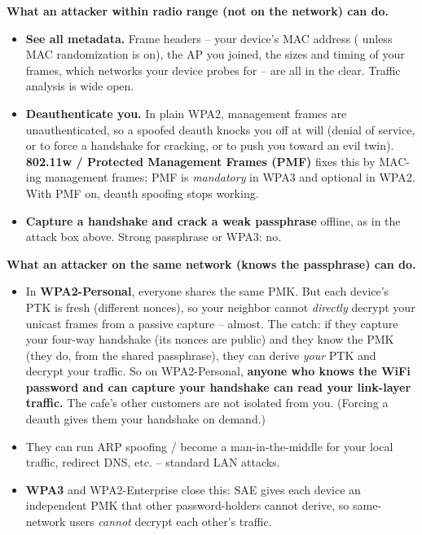 \begin{focusbox}
\textbf{What an attacker within radio range (not on the network) can do.}
\begin{itemize}
  \item \textbf{See all metadata.} Frame headers -- your device's MAC address (
        unless MAC randomization is on), the AP you joined, the sizes and timing
        of your frames, which networks your device probes for -- are all in the
        clear. Traffic analysis is wide open.
  \item \textbf{Deauthenticate you.} In plain WPA2, management frames are
        unauthenticated, so a spoofed deauth knocks you off at will (denial of
        service, or to force a handshake for cracking, or to push you toward an
        evil twin). \textbf{802.11w / Protected Management Frames (PMF)} fixes
        this by MAC-ing management frames; PMF is \emph{mandatory} in WPA3 and
        optional in WPA2. With PMF on, deauth spoofing stops working.
  \item \textbf{Capture a handshake and crack a weak passphrase} offline, as in
        the attack box above. Strong passphrase or WPA3: no.
\end{itemize}

\textbf{What an attacker on the same network (knows the passphrase) can do.}
\begin{itemize}
  \item In \textbf{WPA2-Personal}, everyone shares the same PMK. But each device's
        PTK is fresh (different nonces), so your neighbor cannot \emph{directly}
        decrypt your unicast frames from a passive capture -- almost. The catch:
        if they capture your four-way handshake (its nonces are public) and they
        know the PMK (they do, from the shared passphrase), they can derive \emph{your}
        PTK and decrypt your traffic. So on WPA2-Personal, \textbf{anyone who knows
        the WiFi password and can capture your handshake can read your link-layer
        traffic.} The cafe's other customers are not isolated from you. (Forcing a
        deauth gives them your handshake on demand.)
  \item They can run ARP spoofing / become a man-in-the-middle for your local
        traffic, redirect DNS, etc. -- standard LAN attacks.
  \item \textbf{WPA3} and WPA2-Enterprise close this: SAE gives each device an
        independent PMK that other password-holders cannot derive, so same-network
        users \emph{cannot} decrypt each other's traffic.
\end{itemize}
\end{focusbox}

